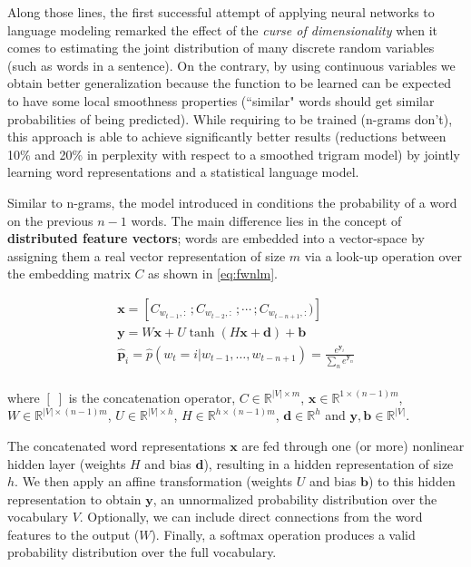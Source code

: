 Along those lines, the first successful attempt of applying neural networks to language modeling \cite{bengio2003neural} remarked the effect of the \textit{curse of dimensionality} when it comes to estimating the joint distribution of many discrete random variables (such as words in a sentence). On the contrary, by using continuous variables we obtain better generalization because the function to be learned can be expected to have some local smoothness properties (``similar" words should get similar probabilities of being predicted). While requiring to be trained (n-grams don't), this approach is able to achieve significantly better results (reductions between 10\% and 20\% in perplexity with respect to a smoothed trigram model) by jointly learning word representations and a statistical language model.

Similar to n-grams, the model introduced in \cite{bengio2003neural} conditions the probability of a word on the previous $n-1$ words. The main difference lies in the concept of \textbf{distributed feature vectors}; words are embedded into a vector-space by assigning them a real vector representation of size $m$ via a look-up operation over the embedding matrix $C$ as shown in \autoref{eq:fwnlm}. 

\begin{equation} \label{eq:fwnlm}
	\begin{gathered}
		\mathbf{x} = [C_{w_{t-1},:} \, ; C_{w_{t-2},:} \, ; \cdots \, ; C_{w_{t-n+1},:})] \\
		\mathbf{y} = W\mathbf{x} + U \tanh(H\mathbf{x}+\mathbf{d}) + \mathbf{b} \\
		\mathbf{\hat{p}}_i=\hat{p}(w_t=i|w_{t-1},\ldots,w_{t-n+1}) = \frac{e^{\mathbf{y}_i}}{\sum_{n}e^{\mathbf{y}_n}} \\
	\end{gathered}
\end{equation}

where $[\;]$ is the concatenation operator, $C \in \mathbb{R}^{|V| \times m}$, $\mathbf{x} \in \mathbb{R}^{1 \times (n-1)m}$, $W \in \mathbb{R}^{|V| \times (n-1)m}$, $U \in \mathbb{R}^{|V| \times h}$, $H \in \mathbb{R}^{h \times (n-1)m}$, $\mathbf{d} \in \mathbb{R}^{h}$ and $\mathbf{y} ,\mathbf{b} \in \mathbb{R}^{|V|}$. 

The concatenated word representations $\mathbf{x}$ are fed through one (or more) nonlinear hidden layer (weights $H$ and bias $\mathbf{d}$), resulting in a hidden representation of size $h$. We then apply an affine transformation (weights $U$ and bias $\mathbf{b}$) to this hidden representation to obtain $\mathbf{y}$, an unnormalized probability distribution over the vocabulary $V$. Optionally, we can include direct connections from the word features to the output ($W$). Finally, a softmax operation produces a valid probability distribution over the full vocabulary.

